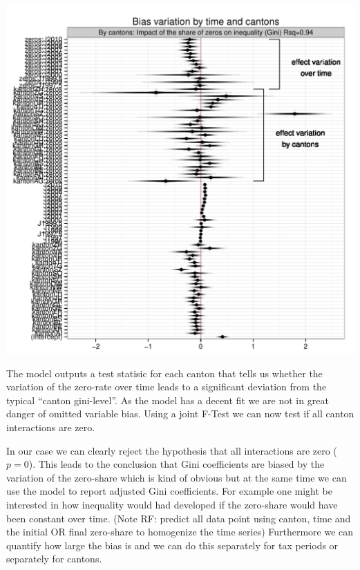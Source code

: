 \documentclass[twoside]{article}\usepackage[]{graphicx}\usepackage[]{color}
\makeatletter
\def\maxwidth{ %
  \ifdim\Gin@nat@width>\linewidth
    \linewidth
  \else
    \Gin@nat@width
  \fi
}
\newenvironment{knitrout}{}{} %
\makeatother
\begin{document}
\begin{multicols}{2}
\begin{knitrout}
\color{fgcolor}
\includegraphics[width=\maxwidth]{figure/corrected_gini} 

\end{knitrout}


The model outputs a test statisic for each canton that tells us whether the variation of the zero-rate over time leads to a significant deviation from the typical ``canton gini-level''. As the model has a decent fit we are not in great danger of omitted variable bias. Using a joint F-Test we can now test if all canton interactions are zero. 




In our case we can clearly reject the hypothesis that all interactions are zero ($p=0$). This leads to the conclusion  that Gini coefficients are biased by the variation of the zero-share which is kind of obvious but at the same time we can use the model to report adjusted Gini coefficients. For example one might be interested in how inequality would had developed if the zero-share would have been constant over time. (Note RF: predict all data point using canton, time and the initial OR final zero-share to homogenize the time series)
Furthermore we can quantify how large the bias is and we can do this separately for tax periods or separately for cantons. 


\end{multicols}
\end{document}
